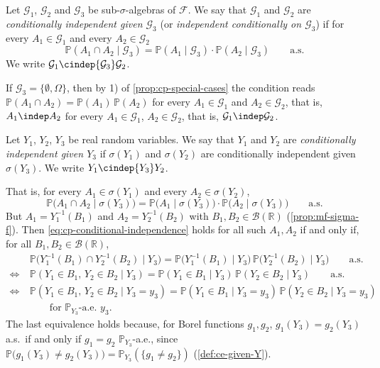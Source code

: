\begin{definition}\label{def:cp-conditional-independence}
Let $\mathcal G_1$, $\mathcal G_2$ and $\mathcal G_3$ be sub-$\sigma$-algebras of $\mathcal F$. We
say that $\mathcal G_1$ and $\mathcal G_2$ are \emph{conditionally independent given
$\mathcal G_3$} (or \emph{independent conditionally on $\mathcal G_3$}) if for every
$A_1\in\mathcal G_1$ and every $A_2\in\mathcal G_2$
\[
  \mathbb P(A_1\cap A_2\mid\mathcal G_3)=\mathbb P(A_1\mid\mathcal G_3)\cdot\mathbb P(A_2\mid\mathcal G_3)\qquad\text{a.s.}
\]
We write $\mathcal G_1\cindep{\mathcal G_3}\mathcal G_2$.
\end{definition}

\begin{remark}\label{rem:cp-trivial-conditioning}
If $\mathcal G_3=\{\emptyset,\Omega\}$, then by 1) of \cref{prop:cp-special-cases} the condition
reads $\mathbb P(A_1\cap A_2)=\mathbb P(A_1)\,\mathbb P(A_2)$ for every $A_1\in\mathcal G_1$ and
$A_2\in\mathcal G_2$, that is, $A_1\indep A_2$ for every $A_1\in\mathcal G_1$, $A_2\in\mathcal G_2$,
that is, $\mathcal G_1\indep\mathcal G_2$.
\end{remark}

\begin{definition}\label{def:cp-conditional-independence-rv}
Let $Y_1$, $Y_2$, $Y_3$ be real random variables. We say that $Y_1$ and $Y_2$ are
\emph{conditionally independent given $Y_3$} if $\sigma(Y_1)$ and $\sigma(Y_2)$ are conditionally
independent given $\sigma(Y_3)$. We write $Y_1\cindep{Y_3}Y_2$.
\end{definition}

That is, for every $A_1\in\sigma(Y_1)$ and every $A_2\in\sigma(Y_2)$,
\begin{equation}\label{eq:cp-conditional-independence}
  \mathbb P\big(A_1\cap A_2\mid\sigma(Y_3)\big)=\mathbb P\big(A_1\mid\sigma(Y_3)\big)\cdot\mathbb P\big(A_2\mid\sigma(Y_3)\big)\qquad\text{a.s.}
\end{equation}
But $A_1=Y_1^{-1}(B_1)$ and $A_2=Y_2^{-1}(B_2)$ with $B_1,B_2\in\mathcal B(\mathbb R)$
(\cref{prop:mf-sigma-f}). Then \eqref{eq:cp-conditional-independence} holds for all such $A_1,A_2$
if and only if, for all $B_1,B_2\in\mathcal B(\mathbb R)$,
\[
\begin{aligned}
  &\mathbb P\big(Y_1^{-1}(B_1)\cap Y_2^{-1}(B_2)\mid Y_3\big)=\mathbb P\big(Y_1^{-1}(B_1)\mid Y_3\big)\,\mathbb P\big(Y_2^{-1}(B_2)\mid Y_3\big)\qquad\text{a.s.}\\
  \iff\ &\mathbb P(Y_1\in B_1,\,Y_2\in B_2\mid Y_3)=\mathbb P(Y_1\in B_1\mid Y_3)\,\mathbb P(Y_2\in B_2\mid Y_3)\qquad\text{a.s.}\\
  \iff\ &\mathbb P(Y_1\in B_1,\,Y_2\in B_2\mid Y_3=y_3)=\mathbb P(Y_1\in B_1\mid Y_3=y_3)\,\mathbb P(Y_2\in B_2\mid Y_3=y_3)\\
  &\qquad\text{for $\mathbb P_{Y_3}$-a.e.\ $y_3$}.
\end{aligned}
\]
The last equivalence holds because, for Borel functions $g_1,g_2$, $g_1(Y_3)=g_2(Y_3)$ a.s.\ if
and only if $g_1=g_2$ $\mathbb P_{Y_3}$-a.e., since
$\mathbb P\big(g_1(Y_3)\ne g_2(Y_3)\big)=\mathbb P_{Y_3}(\{g_1\ne g_2\})$ (\cref{def:ce-given-Y}).

